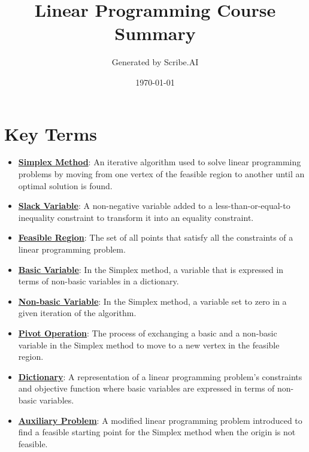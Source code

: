 \documentclass{article}%
\title{Linear Programming Course Summary}%
\author{Generated by Scribe.AI}%
\date{\today}%
\begin{document}
%
\normalsize%
\maketitle%
\section{Key Terms}%
\label{sec:KeyTerms}%
\begin{itemize}[[leftmargin=*]]%
\item \href{https://www.math.purdue.edu/~yipn/421/2024-08-27-ExSimplex.pdf#page=1}{\textbf{Simplex Method}}: An iterative algorithm used to solve linear programming problems by moving from one vertex of the feasible region to another until an optimal solution is found.%
\item \href{https://www.math.purdue.edu/~yipn/421/2024-08-27-ExSimplex.pdf#page=1}{\textbf{Slack Variable}}: A non-negative variable added to a less-than-or-equal-to inequality constraint to transform it into an equality constraint.%
\item \href{https://www.math.purdue.edu/~yipn/421/2024-08-27-ExSimplex.pdf#page=2}{\textbf{Feasible Region}}: The set of all points that satisfy all the constraints of a linear programming problem.%
\item \href{https://www.math.purdue.edu/~yipn/421/2024-08-27-ExSimplex.pdf#page=9}{\textbf{Basic Variable}}: In the Simplex method, a variable that is expressed in terms of non-basic variables in a dictionary.%
\item \href{https://www.math.purdue.edu/~yipn/421/2024-08-27-ExSimplex.pdf#page=6}{\textbf{Non{-}basic Variable}}: In the Simplex method, a variable set to zero in a given iteration of the algorithm.%
\item \href{https://www.math.purdue.edu/~yipn/421/2024-08-27-ExSimplex.pdf#page=9}{\textbf{Pivot Operation}}: The process of exchanging a basic and a non-basic variable in the Simplex method to move to a new vertex in the feasible region.%
\item \href{https://www.math.purdue.edu/~yipn/421/2024-08-27-ExSimplex.pdf#page=26}{\textbf{Dictionary}}: A representation of a linear programming problem's constraints and objective function where basic variables are expressed in terms of non-basic variables.%
\item \href{https://www.math.purdue.edu/~yipn/421/2024-08-27-ExSimplex.pdf#page=32}{\textbf{Auxiliary Problem}}: A modified linear programming problem introduced to find a feasible starting point for the Simplex method when the origin is not feasible.%
\end{itemize}
\end{document}
